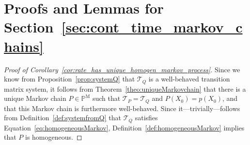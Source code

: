 \documentclass[10pt]{paper}
\theoremstyle{definition}
\newcommand{\processes}{\mathbb{P}}
\newcommand{\mprocesses}{\processes^{\mathrm{M}}}
\begin{document}
\section{Proofs and Lemmas for Section~\ref{sec:cont_time_markov_chains}}

\begin{proof}[Proof of Corollary~\ref{cor:rate_has_unique_homogen_markov_process}]
Since we know from Proposition~\ref{prop:systemQ} that $\mathcal{T}_Q$ is a well-behaved transition matrix system, it follows from Theorem~\ref{theo:uniqueMarkovchain} that there is a unique Markov chain $P\in\mprocesses$ such that $\mathcal{T}_P=\mathcal{T}_Q$ and $P(X_0)=p(X_0)$, and that this Markov chain is furthermore well-behaved. Since it---trivially---follows from Definition~\ref{def:systemfromQ} that $\mathcal{T}_Q$ satisfies Equation~\eqref{eq:homogeneousMarkov}, Definition~\ref{def:homogeneousMarkov} implies that $P$ is homogeneous.
\end{proof}
\end{document}
